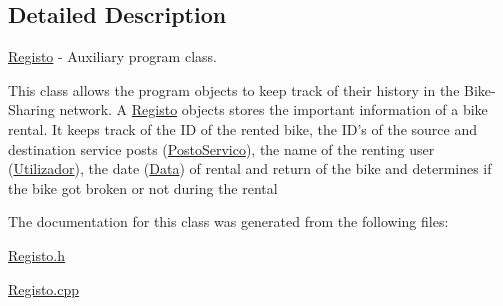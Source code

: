 \subsection{Detailed Description}
\hyperlink{class_registo}{Registo} -\/ Auxiliary program class. 

This class allows the program objects to keep track of their history in the Bike-\/\+Sharing network. A \hyperlink{class_registo}{Registo} objects stores the important information of a bike rental. It keeps track of the I\+D of the rented bike, the I\+D's of the source and destination service posts (\hyperlink{class_posto_servico}{Posto\+Servico}), the name of the renting user (\hyperlink{class_utilizador}{Utilizador}), the date (\hyperlink{class_data}{Data}) of rental and return of the bike and determines if the bike got broken or not during the rental 

The documentation for this class was generated from the following files\+:\begin{DoxyCompactItemize}
\item 
\hyperlink{_registo_8h}{Registo.\+h}\item 
\hyperlink{_registo_8cpp}{Registo.\+cpp}\end{DoxyCompactItemize}

